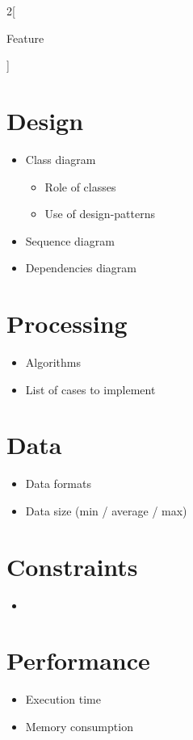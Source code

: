 \documentclass[10pt]{article}
\begin{document}
\begin{multicols}{2}[
    \begin{center}
      \Huge{Feature}
    \end{center}
    ]
    \section*{Design}
    \begin{itemize}
      \item Class diagram
      \begin{itemize}
        \item Role of classes
        \item Use of design-patterns
      \end{itemize}
      \item Sequence diagram
      \item Dependencies diagram
    \end{itemize}

    \section*{Processing}
    \begin{itemize}
      \item Algorithms
      \item List of cases to implement
    \end{itemize}
  
    \section*{Data}
    \begin{itemize}    
      \item Data formats
      \item Data size (min / average / max)
    \end{itemize}
  
    \section*{Constraints}
    \begin{itemize}
      \item 
    \end{itemize}

    \section*{Performance}
    \begin{itemize}
      \item Execution time
      \item Memory consumption
    \end{itemize}    
  

\end{multicols}
\end{document}

